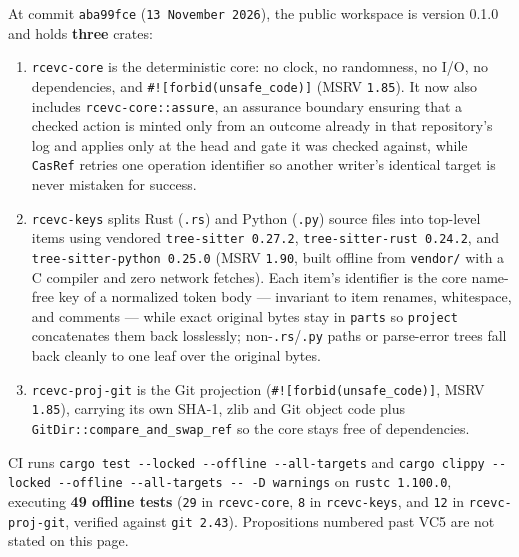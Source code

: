 \documentclass[10pt,letterpaper]{article}
\providecommand{\tightlist}{\setlength{\itemsep}{1pt}\setlength{\parskip}{0pt}}
\begin{document}
At commit \texttt{aba99fce} (\texttt{13\ November\ 2026}), the public
workspace is version 0.1.0 and holds \textbf{three} crates:

\begin{enumerate}
\def\labelenumi{\arabic{enumi}.}
\tightlist
\item
  \texttt{rcevc-core} is the deterministic core: no clock, no
  randomness, no I/O, no dependencies, and
  \texttt{\#!{[}forbid(unsafe\_code){]}} (MSRV \texttt{1.85}). It now
  also includes \texttt{rcevc-\allowbreak{}core::assure}, an assurance boundary
  ensuring that a checked action is minted only from an outcome already
  in that repository's log and applies only at the head and gate it was
  checked against, while \texttt{CasRef} retries one operation
  identifier so another writer's identical target is never mistaken for
  success.
\item
  \texttt{rcevc-keys} splits Rust (\texttt{.rs}) and Python
  (\texttt{.py}) source files into top-level items using vendored
  \texttt{tree-\allowbreak{}sitter\ 0.\allowbreak{}27.\allowbreak{}2}, \texttt{tree-\allowbreak{}sitter-\allowbreak{}rust\ 0.\allowbreak{}24.\allowbreak{}2}, and
  \texttt{tree-\allowbreak{}sitter-\allowbreak{}python\ 0.\allowbreak{}25.\allowbreak{}0} (MSRV \texttt{1.90}, built offline
  from \texttt{vendor/} with a C compiler and zero network fetches).
  Each item's identifier is the core name-free key of a normalized token
  body --- invariant to item renames, whitespace, and comments --- while
  exact original bytes stay in \texttt{parts} so \texttt{project}
  concatenates them back losslessly; non-\texttt{.rs}/\texttt{.py} paths
  or parse-error trees fall back cleanly to one leaf over the original
  bytes.
\item
  \texttt{rcevc-proj-git} is the Git projection
  (\texttt{\#!{[}forbid(unsafe\_code){]}}, MSRV \texttt{1.85}), carrying
  its own SHA-1, zlib and Git object code plus
  \texttt{GitDir::compare\_\allowbreak{}and\_\allowbreak{}swap\_\allowbreak{}ref} so the core stays free of
  dependencies.
\end{enumerate}

CI runs \texttt{cargo\ test\ -\allowbreak{}\/\allowbreak{}-\allowbreak{}locked\ -\allowbreak{}\/\allowbreak{}-\allowbreak{}offline\ -\allowbreak{}\/\allowbreak{}-\allowbreak{}all-\allowbreak{}targets}
and
\texttt{cargo\ clippy\ -\allowbreak{}\/\allowbreak{}-\allowbreak{}locked\ -\allowbreak{}\/\allowbreak{}-\allowbreak{}offline\ -\allowbreak{}\/\allowbreak{}-\allowbreak{}all-\allowbreak{}targets\ -\allowbreak{}\/\allowbreak{}-\allowbreak{}\ -\allowbreak{}D\ warnings}
on \texttt{rustc\ 1.100.0}, executing \textbf{49 offline tests}
(\texttt{29} in \texttt{rcevc-core}, \texttt{8} in \texttt{rcevc-keys},
and \texttt{12} in \texttt{rcevc-proj-git}, verified against
\texttt{git\ 2.43}). Propositions numbered past VC5 are not stated on
this page.
\end{document}
